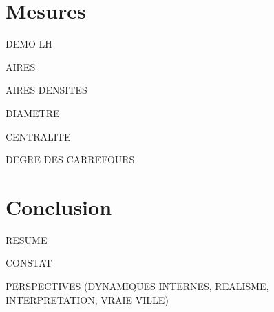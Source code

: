 \documentclass[12pt]{article}
\begin{document}
\section{Mesures}

DEMO LH

AIRES

AIRES DENSITES

DIAMETRE

CENTRALITE

DEGRE DES CARREFOURS

\section{Conclusion}

RESUME

CONSTAT

PERSPECTIVES (DYNAMIQUES INTERNES, REALISME, INTERPRETATION, VRAIE VILLE)

\printbibliography
\end{document}
